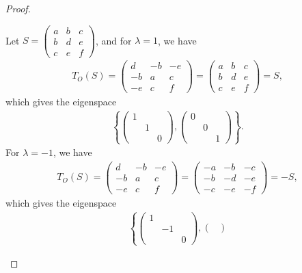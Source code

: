 \documentclass[11pt]{book}
\theoremstyle{definition}
\numberwithin{equation}{chapter}
\begin{document}
\begin{proof}
\begin{enumerate}[label=(\alph*)]
    Let $S = \begin{pmatrix}
        a & b & c \\
        b & d & e \\
        c & e & f
    \end{pmatrix}$, and for $\lambda = 1$, we have
    \begin{align*}
        T_O(S) = \begin{pmatrix}
        d & -b & -e \\
        -b & a & c \\
        -e & c & f
    \end{pmatrix} = \begin{pmatrix}
        a & b & c \\
        b & d & e \\
        c & e & f
    \end{pmatrix} = S,
    \end{align*}
    which gives the eigenspace
    \begin{align*}
        \left\{\begin{pmatrix}
        1 & &  \\
        & 1 &  \\
        & & 0
    \end{pmatrix}, \begin{pmatrix}
        0 & &  \\
        & 0 &  \\
        & & 1
    \end{pmatrix}\right\}.
    \end{align*}
    For $\lambda = -1$, we have
    \begin{align*}
        T_O(S) = \begin{pmatrix}
        d & -b & -e \\
        -b & a & c \\
        -e & c & f
    \end{pmatrix} = \begin{pmatrix}
        -a & -b & -c \\
        -b & -d & -e \\
        -c & -e & -f
    \end{pmatrix} = -S,
    \end{align*}
    which gives the eigenspace
    \begin{align*}
        \left\{\begin{pmatrix}
        1 & &  \\
        & -1 &  \\
        & & 0
    \end{pmatrix}, \begin{pmatrix}

\end{pmatrix}
\end{align*}
\end{enumerate}
\end{proof}
\end{document}
